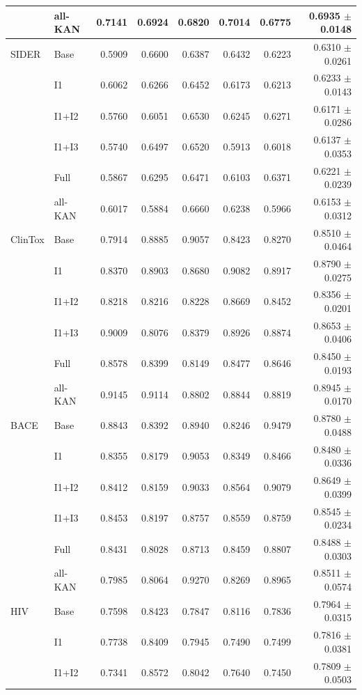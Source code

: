 \begin{landscape}
\begin{longtable}{llrrrrrr}
 & all-KAN & 0.7141 & 0.6924 & 0.6820 & 0.7014 & 0.6775 & 0.6935 $\pm$ 0.0148 \\
\midrule
SIDER & Base & 0.5909 & 0.6600 & 0.6387 & 0.6432 & 0.6223 & 0.6310 $\pm$ 0.0261 \\
 & I1 & 0.6062 & 0.6266 & 0.6452 & 0.6173 & 0.6213 & 0.6233 $\pm$ 0.0143 \\
 & I1+I2 & 0.5760 & 0.6051 & 0.6530 & 0.6245 & 0.6271 & 0.6171 $\pm$ 0.0286 \\
 & I1+I3 & 0.5740 & 0.6497 & 0.6520 & 0.5913 & 0.6018 & 0.6137 $\pm$ 0.0353 \\
 & Full & 0.5867 & 0.6295 & 0.6471 & 0.6103 & 0.6371 & 0.6221 $\pm$ 0.0239 \\
 & all-KAN & 0.6017 & 0.5884 & 0.6660 & 0.6238 & 0.5966 & 0.6153 $\pm$ 0.0312 \\
\midrule
ClinTox & Base & 0.7914 & 0.8885 & 0.9057 & 0.8423 & 0.8270 & 0.8510 $\pm$ 0.0464 \\
 & I1 & 0.8370 & 0.8903 & 0.8680 & 0.9082 & 0.8917 & 0.8790 $\pm$ 0.0275 \\
 & I1+I2 & 0.8218 & 0.8216 & 0.8228 & 0.8669 & 0.8452 & 0.8356 $\pm$ 0.0201 \\
 & I1+I3 & 0.9009 & 0.8076 & 0.8379 & 0.8926 & 0.8874 & 0.8653 $\pm$ 0.0406 \\
 & Full & 0.8578 & 0.8399 & 0.8149 & 0.8477 & 0.8646 & 0.8450 $\pm$ 0.0193 \\
 & all-KAN & 0.9145 & 0.9114 & 0.8802 & 0.8844 & 0.8819 & 0.8945 $\pm$ 0.0170 \\
\midrule
BACE & Base & 0.8843 & 0.8392 & 0.8940 & 0.8246 & 0.9479 & 0.8780 $\pm$ 0.0488 \\
 & I1 & 0.8355 & 0.8179 & 0.9053 & 0.8349 & 0.8466 & 0.8480 $\pm$ 0.0336 \\
 & I1+I2 & 0.8412 & 0.8159 & 0.9033 & 0.8564 & 0.9079 & 0.8649 $\pm$ 0.0399 \\
 & I1+I3 & 0.8453 & 0.8197 & 0.8757 & 0.8559 & 0.8759 & 0.8545 $\pm$ 0.0234 \\
 & Full & 0.8431 & 0.8028 & 0.8713 & 0.8459 & 0.8807 & 0.8488 $\pm$ 0.0303 \\
 & all-KAN & 0.7985 & 0.8064 & 0.9270 & 0.8269 & 0.8965 & 0.8511 $\pm$ 0.0574 \\
\midrule
HIV & Base & 0.7598 & 0.8423 & 0.7847 & 0.8116 & 0.7836 & 0.7964 $\pm$ 0.0315 \\
 & I1 & 0.7738 & 0.8409 & 0.7945 & 0.7490 & 0.7499 & 0.7816 $\pm$ 0.0381 \\
 & I1+I2 & 0.7341 & 0.8572 & 0.8042 & 0.7640 & 0.7450 & 0.7809 $\pm$ 0.0503 \\

\end{longtable}
\end{landscape}
